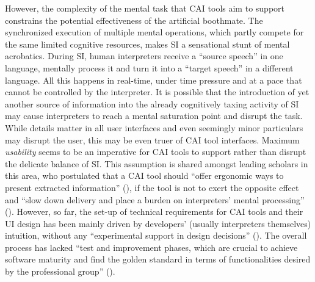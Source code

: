 However, the complexity of the mental task that CAI tools aim to support constrains the potential effectiveness of the artificial boothmate. The synchronized execution of multiple mental operations, which partly compete for the same limited cognitive resources, makes SI a sensational stunt of mental acrobatics. During SI, human interpreters receive a “source speech” in one language, mentally process it and turn it into a “target speech” in a different language. All this happens in real-time, under time pressure and at a pace that cannot be controlled by the interpreter. It is possible that the introduction of yet another source of information into the already cognitively taxing activity of SI may cause interpreters to reach a mental saturation point and disrupt the task. While details matter in all user interfaces and even seemingly minor particulars may disrupt the user, this may be even truer of CAI tool interfaces. Maximum \textit{usability} seems to be an imperative for CAI tools to support rather than disrupt the delicate balance of SI. This assumption is shared amongst leading scholars in this area, who postulated that a CAI tool should ``offer ergonomic ways to present extracted information'' (\citealt[26]{fantinuoli2017speech}), if the tool is not to exert the opposite effect and ``slow down delivery and place a burden on interpreters’ mental processing'' (\citealt[2]{defrancq2021automatic}). However, so far, the set-up of technical requirements for CAI tools and their UI design has been mainly driven by developers’ (usually interpreters themselves) intuition, without any ``experimental support in design decisions''  (\citealt[160]{fantinuoli2018b}). The overall process has lacked ``test and improvement phases, which are crucial to achieve software maturity and find the golden standard in terms of functionalities desired by the professional group'' (\citealt[164]{fantinuoli2018a}).

